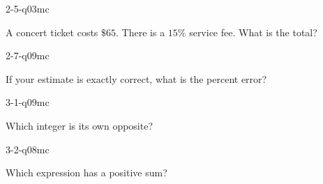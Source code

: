 \begin{practiceQuestion}{2-5-q03}{mc}
\begin{questionText}
A concert ticket costs $\$65$. There is a $15\%$ service fee. What is the total?
\end{questionText}
\end{practiceQuestion}

\begin{practiceQuestion}{2-7-q09}{mc}
\begin{questionText}
If your estimate is exactly correct, what is the percent error?
\end{questionText}
\end{practiceQuestion}

\begin{practiceQuestion}{3-1-q09}{mc}
\begin{questionText}
Which integer is its own opposite?
\end{questionText}
\end{practiceQuestion}

\begin{practiceQuestion}{3-2-q08}{mc}
\begin{questionText}
Which expression has a positive sum?
\end{questionText}
\end{practiceQuestion}

